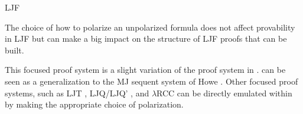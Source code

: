 \begin{entry}{LJF}
\begin{clarifications}
The choice of how to polarize an
unpolarized formula does not affect provability in LJF but can make a
big impact on the structure of LJF proofs that can be built.  
\end{clarifications}

\begin{history}
This focused proof system is a slight variation of the proof system in
\cite{liang09tcs,liang07csl}.  
\LJF can be seen as a generalization to the MJ sequent system of Howe
\cite{howe98phd}. 
Other focused proof systems, such as LJT \cite{herbelin95phd},
LJQ/LJQ' \cite{dyckhoff06cie}, and $\lambda$RCC
\cite{jagadeesan05fsttcs} can be directly emulated within \LJF by
making the appropriate choice of polarization.
\end{history}











\end{entry}
